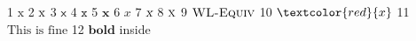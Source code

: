 1 $\textrm{x}$ 2 $\textmd{x}$ 3 $\textsf{x}$ 4 $\texttt{x}$ 5 $\textbf{x}$ 6 $\textit{x}$ 7 $\textsl{x}$ 8 $\textsc{x}$ 9 $\textsc{WL-Equiv}$ 10 $\textcolor{red}{x}$ 11 $\text{This is fine}$ 12 $\textbf{bold}$ inside
